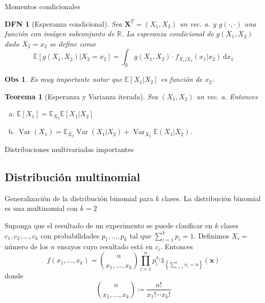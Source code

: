 \documentclass[a4paper]{article}
\newtheorem{definition}{DFN}
\theoremstyle{mytheoremstyle}
\newtheorem{theorem}{Teorema}
\newtheorem*{obs}{Obs}
\newcommand{\R}{\mathbb{R}}
\newcommand{\E}{\mathbb{E}}
\newcommand{\1}{\mathds{1}}
\DeclareMathOperator{\Var}{Var}
\renewcommand{\vec}[1]{\boldsymbol{#1}}
\newcommand{\diff}[1]{\,\mathrm{d}#1}
\begin{document}
\begin{multicols*}{3}
\begin{roundbox}{Momentos condicionales}
\begin{definition}[Esperanza condicional]
    Sea $\vec{X}^{T} = (X_1, X_2)$ un vec. a. y $g(\cdot, \cdot)$ una función con imágen subconjunto de $\R$.
    La esperanza condicional de $g(X_1, X_2)$ dado $X_2 = x_2$ se define como 
    \begin{equation*}
        \E \left[ g(X_1, X_2) | X_2 = x_2  \right] = \int_{\R} g(X_1, X_2) \cdot f_{X_1 | X_2} (x_1 | x_2) \diff{x_1}
    \end{equation*}
\end{definition}
\begin{obs}
    Es muy importante notar que $\E[X_1 | X_2]$ es función de $x_2$.
\end{obs}
\begin{theorem}[Esperanza y Varianza iterada]
    Sea $(X_1, X_2)$ un vec. a. Entonces 
    \begin{enumerate}[a)]
        \item $\E[X_1] = \E_{X_2} \E [X_1 | X_2]$
        \item $\Var(X_1) = \E_{X_2} \Var(X_1 | X_2) + \Var_{X_2} \E(X_1 | X_2)$.
    \end{enumerate}
\end{theorem}
\end{roundbox}

\begin{roundbox}{Distribuciones multivariadas importantes}
\subsection*{Distribución multinomial}
Generalización de la distribución binomial para $k$ clases.
La distribución binomial es una multinomial con $k=2$

Suponga que el resultado de un experimento se puede clasificar en $k$ clases $c_1, c_2, \dots , c_k$ con probabilidades $p_1, \dots , p_k$ tal que $\sum_{i=1}^{k} p_i = 1$.
Definimos $X_i=$ número de los $n$ ensayos cuyo resultado está en $c_i$.
Entonces
\begin{equation*}
    f(x_1,\dots, x_k) = \binom{n}{x_1, \dots, x_k} \prod_{i=1}^{n} p_{i}^{x_i} \1_{\left\{ \sum_{i=1}^{k} x_i  = n\right\}} (\vec{x})
\end{equation*} 
donde
\begin{equation*}
    \binom{n}{x_1, \dots , x_k} \coloneqq \frac{n!}{x_1! \cdots x_k !}
\end{equation*}


\end{roundbox}
\end{multicols*}
\end{document}
